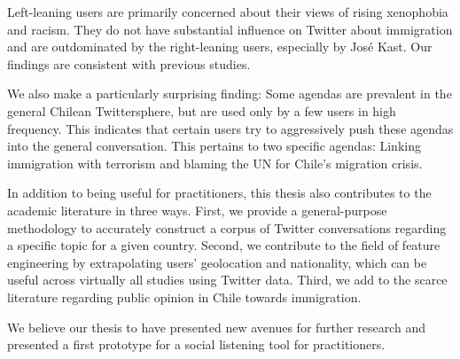     Left-leaning users are primarily concerned about their views of rising xenophobia and racism. They do not have substantial influence on Twitter about immigration and are outdominated by the right-leaning users, especially by José Kast. Our findings are consistent with previous studies. 
    
    We also make a particularly surprising finding: Some agendas are prevalent in the general Chilean Twittersphere, but are used only by a few users in high frequency. This indicates that certain users try to aggressively push these agendas into the general conversation. This pertains to two specific agendas: Linking immigration with terrorism and blaming the UN for Chile's migration crisis.
    
    In addition to being useful for practitioners, this thesis also contributes to the academic literature in three ways. First, we provide a general-purpose methodology to accurately construct a corpus of Twitter conversations regarding a specific topic for a given country. Second, we contribute to the field of feature engineering by extrapolating users' geolocation and nationality, which can be useful across virtually all studies using Twitter data. Third, we add to the scarce literature regarding public opinion in Chile towards immigration.
    
    We believe our thesis to have presented new avenues for further research and presented a first prototype for a social listening tool for practitioners.